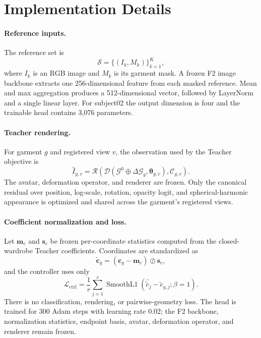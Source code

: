 \section{Implementation Details}
\label{sec:supp_implementation}

\paragraph{Reference inputs.}
The reference set is
\begin{equation}
\mathcal S=\{(I_k,M_k)\}_{k=1}^{K},
\end{equation}
where $I_k$ is an RGB image and $M_k$ is its garment mask. A frozen F2 image backbone extracts one 256-dimensional feature from each masked reference. Mean and max aggregation produces a 512-dimensional vector, followed by LayerNorm and a single linear layer. For subject02 the output dimension is four and the trainable head contains 3,076 parameters.

\paragraph{Teacher rendering.}
For garment $g$ and registered view $v$, the observation used by the Teacher objective is
\begin{equation}
\widehat I_{g,v}=\mathcal R\!\left(\mathcal D(\mathcal G^0\oplus\Delta\mathcal G_g,\boldsymbol\theta_{g,v}),\mathcal C_{g,v}\right).
\end{equation}
The avatar, deformation operator, and renderer are frozen. Only the canonical residual over position, log-scale, rotation, opacity logit, and spherical-harmonic appearance is optimized and shared across the garment's registered views.

\paragraph{Coefficient normalization and loss.}
Let $\mathbf m_c$ and $\mathbf s_c$ be frozen per-coordinate statistics computed from the closed-wardrobe Teacher coefficients. Coordinates are standardized as
\begin{equation}
\widetilde{\mathbf c}_g=(\mathbf c_g-\mathbf m_c)\oslash\mathbf s_c,
\end{equation}
and the controller uses only
\begin{equation}
\mathcal L_{\mathrm{ctrl}}=\frac{1}{r}\sum_{j=1}^{r}
\operatorname{SmoothL1}(\widehat{\widetilde c}_j-\widetilde c_{g,j};\beta=1).
\end{equation}
There is no classification, rendering, or pairwise-geometry loss. The head is trained for 300 Adam steps with learning rate 0.02; the F2 backbone, normalization statistics, endpoint basis, avatar, deformation operator, and renderer remain frozen.

